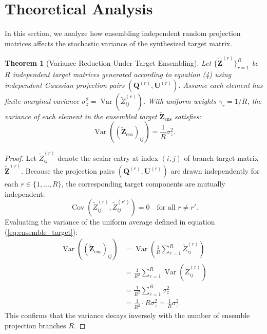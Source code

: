 \documentclass[journal]{IEEEtran}
\newtheorem{theorem}{Theorem}
\begin{document}
\section{Theoretical Analysis}

In this section, we analyze how ensembling independent random projection matrices affects the stochastic variance of the synthesized target matrix.

\begin{theorem}[Variance Reduction Under Target Ensembling]
Let $\{\tilde{\mathbf{Z}}^{(r)}\}_{r=1}^R$ be $R$ independent target matrices generated according to equation (4) using independent Gaussian projection pairs $(\mathbf{Q}^{(r)}, \mathbf{U}^{(r)})$. Assume each element has finite marginal variance $\sigma_z^2 = \operatorname{Var}(\tilde{Z}_{ij}^{(r)})$. With uniform weights $\gamma_r = 1/R$, the variance of each element in the ensembled target $\tilde{\mathbf{Z}}_{\text{ens}}$ satisfies:
\begin{equation}
\operatorname{Var}\left( (\tilde{\mathbf{Z}}_{\text{ens}})_{ij} \right) = \frac{1}{R} \sigma_z^2.
\end{equation}
\end{theorem}

\begin{proof}
Let $\tilde{Z}_{ij}^{(r)}$ denote the scalar entry at index $(i,j)$ of branch target matrix $\tilde{\mathbf{Z}}^{(r)}$. Because the projection pairs $(\mathbf{Q}^{(r)}, \mathbf{U}^{(r)})$ are drawn independently for each $r \in \{1, \dots, R\}$, the corresponding target components are mutually independent:
\begin{equation}
\operatorname{Cov}\left(\tilde{Z}_{ij}^{(r)}, \tilde{Z}_{ij}^{(r')}\right) = 0 \quad \text{for all } r \ne r'.
\end{equation}
Evaluating the variance of the uniform average defined in equation (\ref{eq:ensemble_target}):
\begin{align}
\operatorname{Var}\left( (\tilde{\mathbf{Z}}_{\text{ens}})_{ij} \right) &= \operatorname{Var}\left( \frac{1}{R} \sum_{r=1}^R \tilde{Z}_{ij}^{(r)} \right) \\
&= \frac{1}{R^2} \sum_{r=1}^R \operatorname{Var}\left( \tilde{Z}_{ij}^{(r)} \right) \\
&= \frac{1}{R^2} \sum_{r=1}^R \sigma_z^2 \\
&= \frac{1}{R^2} \cdot R \sigma_z^2 = \frac{1}{R} \sigma_z^2.
\end{align}
This confirms that the variance decays inversely with the number of ensemble projection branches $R$.
\end{proof}
\end{document}
